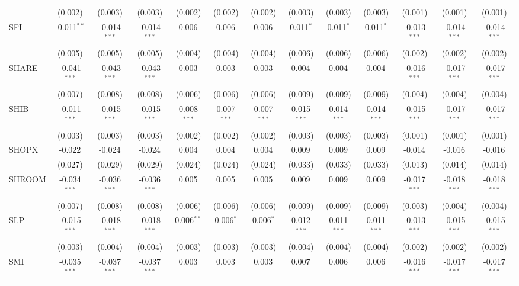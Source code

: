 \begin{table}[!htbp]
\begin{tabular}{@{\extracolsep{5pt}}lcccccccccccc}
  & (0.002) & (0.003) & (0.003) & (0.002) & (0.002) & (0.002) & (0.003) & (0.003) & (0.003) & (0.001) & (0.001) & (0.001) \\
 SFI & -0.011$^{**}$ & -0.014$^{***}$ & -0.014$^{***}$ & 0.006$^{}$ & 0.006$^{}$ & 0.006$^{}$ & 0.011$^{*}$ & 0.011$^{*}$ & 0.011$^{*}$ & -0.013$^{***}$ & -0.014$^{***}$ & -0.014$^{***}$ \\
  & (0.005) & (0.005) & (0.005) & (0.004) & (0.004) & (0.004) & (0.006) & (0.006) & (0.006) & (0.002) & (0.002) & (0.002) \\
 SHARE & -0.041$^{***}$ & -0.043$^{***}$ & -0.043$^{***}$ & 0.003$^{}$ & 0.003$^{}$ & 0.003$^{}$ & 0.004$^{}$ & 0.004$^{}$ & 0.004$^{}$ & -0.016$^{***}$ & -0.017$^{***}$ & -0.017$^{***}$ \\
  & (0.007) & (0.008) & (0.008) & (0.006) & (0.006) & (0.006) & (0.009) & (0.009) & (0.009) & (0.004) & (0.004) & (0.004) \\
 SHIB & -0.011$^{***}$ & -0.015$^{***}$ & -0.015$^{***}$ & 0.008$^{***}$ & 0.007$^{***}$ & 0.007$^{***}$ & 0.015$^{***}$ & 0.014$^{***}$ & 0.014$^{***}$ & -0.015$^{***}$ & -0.017$^{***}$ & -0.017$^{***}$ \\
  & (0.003) & (0.003) & (0.003) & (0.002) & (0.002) & (0.002) & (0.003) & (0.003) & (0.003) & (0.001) & (0.001) & (0.001) \\
 SHOPX & -0.022$^{}$ & -0.024$^{}$ & -0.024$^{}$ & 0.004$^{}$ & 0.004$^{}$ & 0.004$^{}$ & 0.009$^{}$ & 0.009$^{}$ & 0.009$^{}$ & -0.014$^{}$ & -0.016$^{}$ & -0.016$^{}$ \\
  & (0.027) & (0.029) & (0.029) & (0.024) & (0.024) & (0.024) & (0.033) & (0.033) & (0.033) & (0.013) & (0.014) & (0.014) \\
 SHROOM & -0.034$^{***}$ & -0.036$^{***}$ & -0.036$^{***}$ & 0.005$^{}$ & 0.005$^{}$ & 0.005$^{}$ & 0.009$^{}$ & 0.009$^{}$ & 0.009$^{}$ & -0.017$^{***}$ & -0.018$^{***}$ & -0.018$^{***}$ \\
  & (0.007) & (0.008) & (0.008) & (0.006) & (0.006) & (0.006) & (0.009) & (0.009) & (0.009) & (0.003) & (0.004) & (0.004) \\
 SLP & -0.015$^{***}$ & -0.018$^{***}$ & -0.018$^{***}$ & 0.006$^{**}$ & 0.006$^{*}$ & 0.006$^{*}$ & 0.012$^{***}$ & 0.011$^{***}$ & 0.011$^{***}$ & -0.013$^{***}$ & -0.015$^{***}$ & -0.015$^{***}$ \\
  & (0.003) & (0.004) & (0.004) & (0.003) & (0.003) & (0.003) & (0.004) & (0.004) & (0.004) & (0.002) & (0.002) & (0.002) \\
 SMI & -0.035$^{***}$ & -0.037$^{***}$ & -0.037$^{***}$ & 0.003$^{}$ & 0.003$^{}$ & 0.003$^{}$ & 0.007$^{}$ & 0.006$^{}$ & 0.006$^{}$ & -0.016$^{***}$ & -0.017$^{***}$ & -0.017$^{***}$ \\

\end{tabular}
\end{table}
